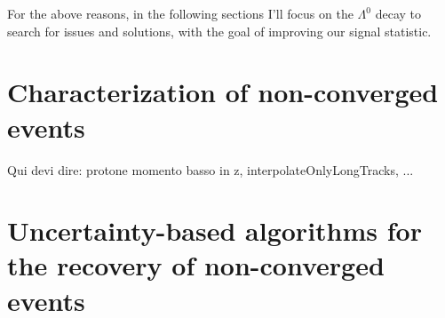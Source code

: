For the above reasons, in the following sections I'll focus on the $\Lambda^0$ decay to search for issues and solutions, with the goal of improving our signal statistic. %


\section{Characterization of non-converged events}
Qui devi dire: protone momento basso in z, interpolateOnlyLongTracks, ...

\section{Uncertainty-based algorithms for the recovery of non-converged events}
